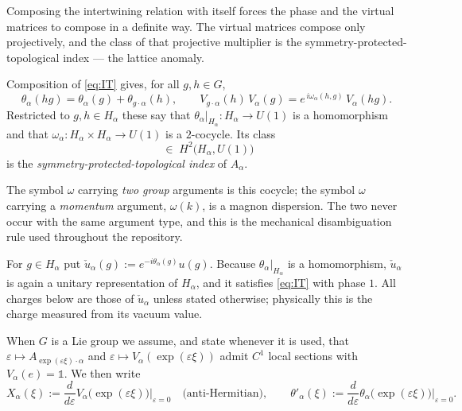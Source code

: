Composing the intertwining relation with itself forces the phase and the
virtual matrices to compose in a definite way. The virtual matrices compose
only projectively, and the class of that projective multiplier is the
symmetry-protected-topological index --- the lattice anomaly.

\begin{definition}
\label{def:cocycle-spt-index}
Composition of \eqref{eq:IT} gives, for all $g, h \in G$,
\begin{equation}
  \theta_{\alpha}(hg) = \theta_{\alpha}(g) + \theta_{g \cdot \alpha}(h),
  \qquad
  V_{g \cdot \alpha}(h) \, V_{\alpha}(g)
  = e^{\,i \omega_{\alpha}(h,g)} \, V_{\alpha}(hg) .
  \label{eq:cocycles}
\end{equation}
Restricted to $g,h \in H_{\alpha}$ these say that
$\theta_{\alpha}\vert_{H_{\alpha}} : H_{\alpha} \to U(1)$ is a homomorphism and
that $\omega_{\alpha} : H_{\alpha} \times H_{\alpha} \to U(1)$ is a $2$-cocycle.
Its class
\begin{equation}
  [\omega_{\alpha}] \;\in\; H^{2}\bigl(H_{\alpha}, U(1)\bigr)
\end{equation}
is the \emph{symmetry-protected-topological index} of $A_{\alpha}$.
\end{definition}

\begin{remark}
The symbol $\omega$ carrying \emph{two group} arguments is this cocycle; the
symbol $\omega$ carrying a \emph{momentum} argument, $\omega(k)$, is a magnon
dispersion. The two never occur with the same argument type, and this is the
mechanical disambiguation rule used throughout the repository.
\end{remark}

\begin{definition}
\label{def:normal-ordering}
For $g \in H_{\alpha}$ put
$\check{u}_{\alpha}(g) := e^{-i\theta_{\alpha}(g)} u(g)$. Because
$\theta_{\alpha}\vert_{H_{\alpha}}$ is a homomorphism, $\check{u}_{\alpha}$ is
again a unitary representation of $H_{\alpha}$, and it satisfies
\eqref{eq:IT} with phase $1$. All charges below are those of
$\check{u}_{\alpha}$ unless stated otherwise; physically this is the charge
measured from its vacuum value.
\end{definition}

\begin{definition}
\label{def:smoothness}
When $G$ is a Lie group we assume, and state whenever it is used, that
$\varepsilon \mapsto A_{\exp(\varepsilon\xi) \cdot \alpha}$ and
$\varepsilon \mapsto V_{\alpha}(\exp(\varepsilon\xi))$ admit $C^{1}$ local
sections with $V_{\alpha}(e) = \mathbb{1}$. We then write
\begin{equation}
  X_{\alpha}(\xi) := \frac{d}{d\varepsilon}
     V_{\alpha}\bigl(\exp(\varepsilon\xi)\bigr)\Big\vert_{\varepsilon = 0}
  \quad \text{(anti-Hermitian)},
  \qquad
  \theta'_{\alpha}(\xi) := \frac{d}{d\varepsilon}
     \theta_{\alpha}\bigl(\exp(\varepsilon\xi)\bigr)\Big\vert_{\varepsilon = 0}.
\end{equation}
\end{definition}

